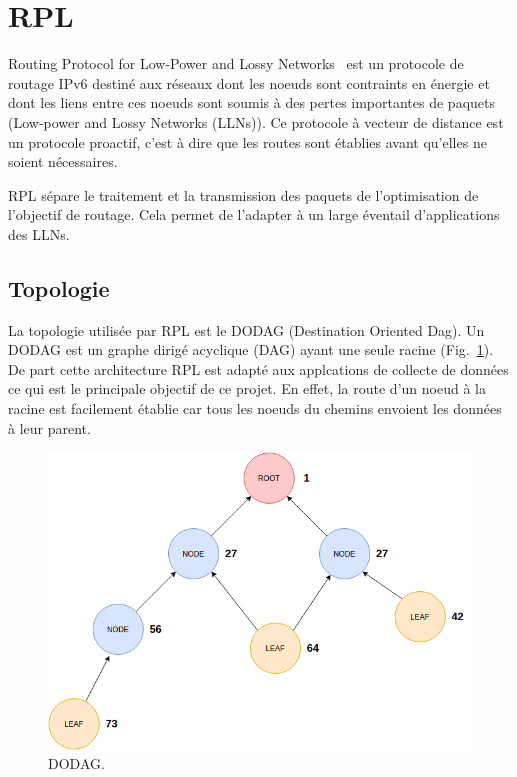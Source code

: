 \newpage
\section{RPL}\label{sec:state-rpl}
\renewcommand{\rightmark}{RPL}

Routing Protocol for Low-Power and Lossy Networks~\cite{rfc:rpl} est un protocole de routage IPv6 destiné aux réseaux dont les noeuds sont contraints en énergie et dont les liens entre ces noeuds sont soumis à des pertes importantes de paquets (Low-power and Lossy Networks (LLNs)).
Ce protocole à vecteur de distance est un protocole proactif, c'est à dire que les routes sont établies avant qu'elles ne soient nécessaires.

RPL sépare le traitement et la transmission des paquets de l'optimisation de l'objectif de routage. Cela permet de l'adapter à un large éventail d'applications des LLNs.

\subsection*{Topologie}
    La topologie utilisée par RPL est le DODAG (Destination Oriented Dag). Un DODAG est un graphe   dirigé acyclique (DAG) ayant une seule racine (Fig.~\ref{fig:state-dodag}). De part cette architecture RPL est adapté aux applcations de collecte de données ce qui est le principale objectif de ce projet. En effet, la route d'un noeud à la racine est facilement établie car tous les noeuds du chemins envoient les données à leur parent.

    \begin{figure}[H]
        \centering
        \includegraphics[scale=0.45]{res/pictures/dodag.drawio.png}
        \caption{DODAG.}
        \label{fig:state-dodag}
    \end{figure}


